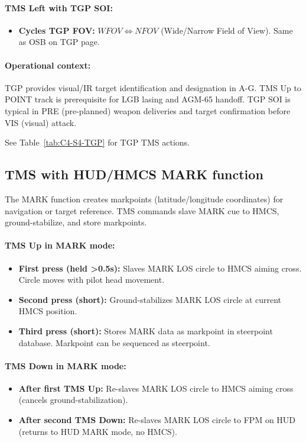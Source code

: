 \documentclass[11pt, a4paper, twoside]{report}
\begin{document}
\paragraph{TMS Left with TGP SOI:}
\begin{itemize}
    \item \textbf{Cycles TGP FOV:} $WFOV \iff NFOV$ (Wide/Narrow Field of View). Same as OSB on TGP page.
\end{itemize}

\paragraph{Operational context:}
TGP provides visual/IR target identification and designation in A-G. TMS Up to POINT track is prerequisite for LGB lasing and AGM-65 handoff. TGP SOI is typical in PRE (pre-planned) weapon deliveries and target confirmation before VIS (visual) attack.

See Table~\ref{tab:C4-S4-TGP} for TGP TMS actions.

\subsection{TMS with HUD/HMCS MARK function}
\label{sec:C4-S4-S3}

The MARK function creates markpoints (latitude/longitude coordinates) for navigation or target reference. TMS commands slave MARK cue to HMCS, ground-stabilize, and store markpoints.

\paragraph{TMS Up in MARK mode:}
\begin{itemize}
    \item \textbf{First press (held >0.5s):} Slaves MARK LOS circle to HMCS aiming cross. Circle moves with pilot head movement.
    \item \textbf{Second press (short):} Ground-stabilizes MARK LOS circle at current HMCS position.
    \item \textbf{Third press (short):} Stores MARK data as markpoint in steerpoint database. Markpoint can be sequenced as steerpoint.
\end{itemize}

\paragraph{TMS Down in MARK mode:}
\begin{itemize}
    \item \textbf{After first TMS Up:} Re-slaves MARK LOS circle to HMCS aiming cross (cancels ground-stabilization).
    \item \textbf{After second TMS Down:} Re-slaves MARK LOS circle to FPM on HUD (returns to HUD MARK mode, no HMCS).
\end{itemize}
\end{document}

